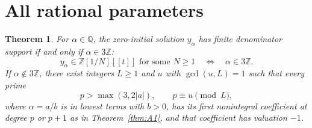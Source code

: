 \documentclass[11pt,a4paper,reqno]{amsart}
\newtheorem{theorem}{Theorem}[section]
\theoremstyle{definition}
\theoremstyle{remark}
\newcommand{\Q}{\mathbb Q}
\newcommand{\Z}{\mathbb Z}
\begin{document}
\section{All rational parameters}

\begin{theorem}\label{thm:rational-parameter}
For $\alpha\in\Q$, the zero-initial solution $y_\alpha$ has finite denominator support if and only if $\alpha\in3\Z$:
\[
 y_\alpha\in\Z[1/N][[t]]\text{ for some }N\ge1
 \quad\Longleftrightarrow\quad \alpha\in3\Z.
\]
If $\alpha\notin3\Z$, there exist integers $L\ge1$ and $u$ with $\gcd(u,L)=1$ such that every prime
\[
 p>\max(3,2|a|),\qquad p\equiv u\pmod L,
\]
where $\alpha=a/b$ is in lowest terms with $b>0$, has its first nonintegral coefficient at degree $p$ or $p+1$ as in Theorem~\ref{thm:A1}, and that coefficient has valuation $-1$.
\end{theorem}
\end{document}
